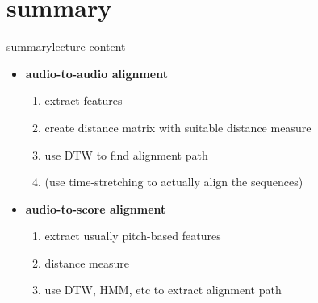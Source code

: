     \section{summary}
        \begin{frame}{summary}{lecture content}
            \begin{itemize}
                \item   \textbf{audio-to-audio alignment}
                    \begin{enumerate}
                        \item   extract features
                        \item   create distance matrix with suitable distance measure
                        \item   use DTW to find alignment path
                        \item   (use time-stretching to actually align the sequences)
                    \end{enumerate}
                \bigskip
                \item   \textbf{audio-to-score alignment}
                    \begin{enumerate}
                        \item   extract usually pitch-based features
                        \item   distance measure
                        \item   use DTW, HMM, etc to extract alignment path
                    \end{enumerate}
            \end{itemize}
        \end{frame}

